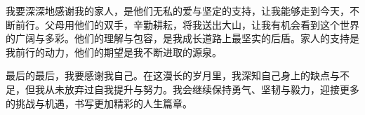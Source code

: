 我要深深地感谢我的家人，是他们无私的爱与坚定的支持，让我能够走到今天，不断前行。父母用他们的双手，辛勤耕耘，将我送出大山，让我有机会看到这个世界的广阔与多彩。他们的理解与包容，是我成长道路上最坚实的后盾。家人的支持是我前行的动力，他们的期望是我不断进取的源泉。

最后的最后，我要感谢我自己。在这漫长的岁月里，我深知自己身上的缺点与不足，但我从未放弃过自我提升与努力。我会继续保持勇气、坚韧与毅力，迎接更多的挑战与机遇，书写更加精彩的人生篇章。



